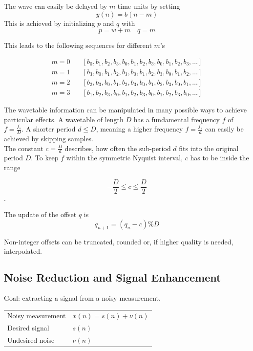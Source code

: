The wave can easily be delayed by $m$ time units by setting
\begin{equation*}
	y(n) = b(n-m)
\end{equation*}
This is achieved by initializing $p$ and $q$ with
\begin{equation*}
	p = w+m \quad q=m
\end{equation*}

This leads to the following sequences for different $m$'s

\begin{align*}
	m=0 \quad &[b_0,b_1,b_2,b_3,b_0,b_1,b_2,b_3,b_0,b_1,b_2,b_3,\ldots] \\
	m=1 \quad &[b_3,b_0,b_1,b_2,b_3,b_0,b_1,b_2,b_3,b_0,b_1,b_2,\ldots] \\
	m=2 \quad &[b_2,b_3,b_0,b_1,b_2,b_3,b_0,b_1,b_2,b_3,b_0,b_1,\ldots] \\
	m=3 \quad &[b_1,b_2,b_3,b_0,b_1,b_2,b_3,b_0,b_1,b_2,b_3,b_0,\ldots]
\end{align*}

The wavetable information can be manipulated in many possible ways to achieve
particular effects. A wavetable of length $D$ has a fundamental frequency $f$
of $f = \frac{f_s}{D}$. A shorter period $d \leq D$, meaning a higher frequency
$f = \frac{f_s}{d}$ can easily be achieved by skipping samples. \\

The constant $c = \frac{D}{d}$ describes, how often the sub-period $d$ fits into the original period $D$. To keep $f$ within the symmetric Nyquist interval, $c$ has to be inside the range

\begin{equation*}
	-\frac{D}{2} \leq c \leq \frac{D}{2}
\end{equation*}.

The update of the offset $q$ is
\begin{equation*}
	q_{n+1} = \left( q_n - c \right) \% D
\end{equation*}

Non-integer offsets can be truncated, rounded or, if higher quality is needed, interpolated.


\subsection{Noise Reduction and Signal Enhancement}
Goal: extracting a signal from a noisy measurement. \\

\begin{tabularx}{\linewidth}{lX}
	Noisy measurement & $x(n) = s(n) + \nu(n)$ \\
	Desired signal & $s(n)$ \\
	Undesired noise & $\nu(n)$ \\
\end{tabularx} \\

